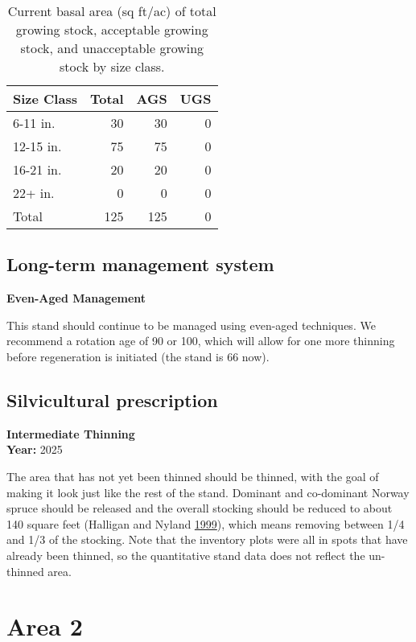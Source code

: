 \documentclass[]{tufte-handout}
\begin{document}
\begin{table}

\caption{\label{tab:unnamed-chunk-7}Current basal area (sq ft/ac) of total growing stock, acceptable growing stock, and unacceptable growing stock by size class.}
\centering
\begin{tabular}[t]{lrrr}
\toprule
Size Class & Total & AGS & UGS\\
\midrule
6-11 in. & 30 & 30 & 0\\
12-15 in. & 75 & 75 & 0\\
16-21 in. & 20 & 20 & 0\\
22+ in. & 0 & 0 & 0\\
Total & 125 & 125 & 0\\
\bottomrule
\end{tabular}
\end{table}

\subsection{Long-term management
system}\label{long-term-management-system}

\textbf{Even-Aged Management}

This stand should continue to be managed using even-aged techniques. We
recommend a rotation age of 90 or 100, which will allow for one more
thinning before regeneration is initiated (the stand is 66 now).

\subsection{Silvicultural
prescription}\label{silvicultural-prescription}

\textbf{Intermediate Thinning}\\
\noindent \textbf{Year:} 2025

The area that has not yet been thinned should be thinned, with the goal
of making it look just like the rest of the stand. Dominant and
co-dominant Norway spruce should be released and the overall stocking
should be reduced to about 140 square feet (Halligan and Nyland
\protect\hyperlink{ref-halligan_relative_1999}{1999}), which means
removing between 1/4 and 1/3 of the stocking. Note that the inventory
plots were all in spots that have already been thinned, so the
quantitative stand data does not reflect the un-thinned area.

\newpage

\section{Area 2}\label{area-2}
\end{document}
